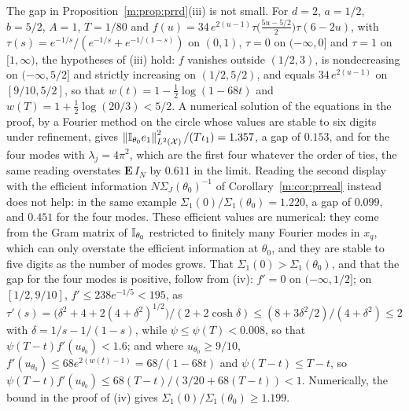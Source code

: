 The gap in Proposition~\ref{m:prop:prrd}(iii) is not small. For $d=2$, $a=1/2$, $b=5/2$, $A=1$, $T=1/80$ and $f(u)=34\,e^{2(u-1)}\tau\big(\tfrac{5u-5/2}{2}\big)\tau(6-2u)$, with $\tau(s)=e^{-1/s}/(e^{-1/s}+e^{-1/(1-s)})$ on $(0,1)$, $\tau=0$ on $(-\infty,0]$ and $\tau=1$ on $[1,\infty)$, the hypotheses of (iii) hold: $f$ vanishes outside $(1/2,3)$, is nondecreasing on $(-\infty,5/2]$ and strictly increasing on $(1/2,5/2)$, and equals $34\,e^{2(u-1)}$ on $[9/10,5/2]$, so that $w(t)=1-\tfrac12\log(1-68t)$ and $w(T)=1+\tfrac12\log(20/3)<5/2$. A numerical solution of the equations in the proof, by a Fourier method on the circle whose values are stable to six digits under refinement, gives $\left\|\mathbb{I}_{\theta_0}e_1\right\|^2_{L^2(\mathcal X)}/(T\iota_1)=1.357$, a gap of $0.153$, and for the four modes with $\lambda_j=4\pi^2$, which are the first four whatever the order of ties, the same reading overstates $\mathbf E\,I_N$ by $0.611$ in the limit. Reading the second display with the efficient information $N\Sigma_J(\theta_0)^{-1}$ of Corollary~\ref{m:cor:prreal} instead does not help: in the same example $\Sigma_1(0)/\Sigma_1(\theta_0)=1.220$, a gap of $0.099$, and $0.451$ for the four modes. These efficient values are numerical: they come from the Gram matrix of $\mathbb{I}_{\theta_0}$ restricted to finitely many Fourier modes in $x_q$, which can only overstate the efficient information at $\theta_0$, and they are stable to five digits as the number of modes grows. That $\Sigma_1(0)>\Sigma_1(\theta_0)$, and that the gap for the four modes is positive, follow from (iv): $f'=0$ on $(-\infty,1/2]$; on $[1/2,9/10]$, $f'\le238e^{-1/5}<195$, as $\tau'(s)=\big(\delta^2+4+2(4+\delta^2)^{1/2}\big)/(2+2\cosh\delta)\le(8+3\delta^2/2)/(4+\delta^2)\le2$ with $\delta=1/s-1/(1-s)$, while $\psi\le\psi(T)<0.008$, so that $\psi(T-t)f'(u_{\theta_0})<1.6$; and where $u_{\theta_0}\ge9/10$, $f'(u_{\theta_0})\le68e^{2(w(t)-1)}=68/(1-68t)$ and $\psi(T-t)\le T-t$, so $\psi(T-t)f'(u_{\theta_0})\le68(T-t)/(3/20+68(T-t))<1$. Numerically, the bound in the proof of (iv) gives $\Sigma_1(0)/\Sigma_1(\theta_0)\ge1.199$.

